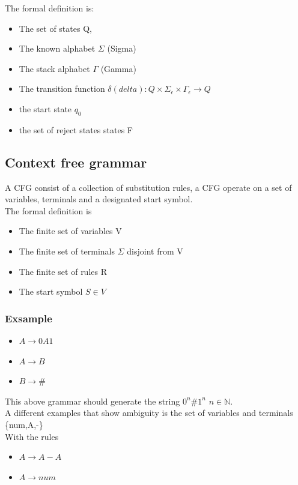 \documentclass[a4paper,10pt,titlepage]{report}
\begin{document}
The formal definition is:

\begin{itemize}
\item The set of states Q, 
\item The known alphabet $\Sigma$ (Sigma) 
\item The stack alphabet $\Gamma $ (Gamma)
\item The transition function $\delta (delta): Q \times \Sigma_\epsilon \times \Gamma_\epsilon\longrightarrow Q$
\item the start state $q_0$ 
\item the set of reject states states F
\end{itemize} 
\subsection{Context free grammar}
A CFG consist of a collection of substitution rules, a CFG operate on a set of variables, terminals and a designated start symbol.\\
The formal definition is
\begin{itemize}
\item The finite set of variables V
\item The finite set of terminals $\Sigma$ disjoint from V
\item The finite set of rules R
\item The start symbol $S \in V$
\end{itemize}
\subsubsection{Exsample}
 \begin{multicols}{3}
\begin{itemize}
\item $A \rightarrow 0A1$
\item $A \rightarrow B$
\item $B \rightarrow \# $
\end{itemize}
\end{multicols}
 
This above grammar should generate the string $0^n\#1^n$ $n \in \mathbb{N} $.\\

A different examples that show ambiguity is the set of variables and terminals \{num,A,-\}\\
With the rules\
 \begin{multicols}{3}
\begin{itemize}
\item $A \rightarrow A-A $
\item $A \rightarrow num$
\end{itemize}
\end{multicols}
\end{document}
